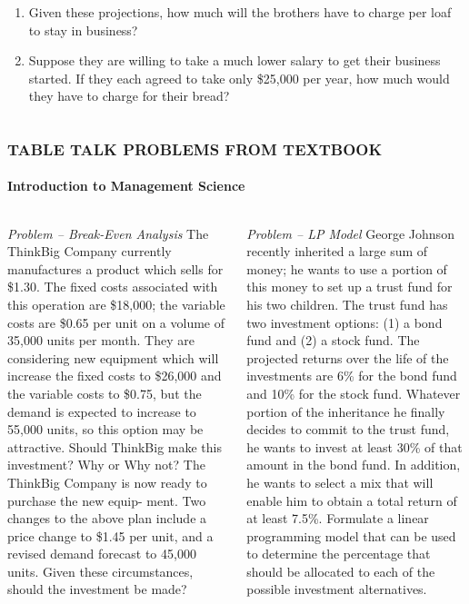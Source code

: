 \documentclass[14 pt]{beamer}
\begin{document}
\begin{frame}[t]
\begin{columns}[t]
\begin{column}{0.45\textwidth}
\begin{enumerate}
  \item Given these projections, how much will the brothers have to charge per loaf to stay in business?
  \item Suppose they are willing to take a much lower salary to get their business started. If they each agreed to take only \$25,000 per year, how much would they have to charge for their bread?
\end{enumerate}
\end{column}
\end{columns}
\end{frame}


\begin{frame}[t]
\frametitle{TABLE TALK PROBLEMS FROM TEXTBOOK}
\framesubtitle{Introduction to Management Science}

\begin{columns}[t]
\begin{column}{0.45\textwidth}
\emph{Problem -- Break-Even Analysis}
\vskip0.5cm%
The ThinkBig Company currently manufactures a product which sells for \$1.30. The fixed costs associated with this operation are \$18,000; the variable costs are \$0.65 per unit on a volume of 35,000 units per month. They are considering new equipment which will increase the fixed costs to \$26,000 and the variable costs to \$0.75, but the demand is expected to increase to 55,000 units, so this option may be attractive. Should ThinkBig make this investment? Why or Why not?
\vskip0.5cm%
The ThinkBig Company is now ready to purchase the new equip- ment. Two changes to the above plan include a price change to \$1.45 per unit, and a revised demand forecast to 45,000 units.
Given these circumstances, should the investment be made?
\end{column}

\begin{column}{0.45\textwidth}
\emph{Problem -- LP Model}
\vskip0.5cm%
George Johnson recently inherited a large sum of money; he wants to use a portion of this money to set up a trust fund for his two children. The trust fund has two investment options: (1) a bond fund and (2) a stock fund. The projected returns over the life of the investments are 6\% for the bond fund and 10\% for the stock fund. Whatever portion of the inheritance he finally decides to commit to the trust fund, he wants to invest at least 30\% of that amount in the bond fund. In addition, he wants to select a mix that will enable him to obtain a total return of at least 7.5\%.
\vskip0.5cm%
Formulate a linear programming model that can be used to determine the percentage that should be allocated to each of the possible investment alternatives.
\end{column}
\end{columns}
\end{frame}
\end{document}
